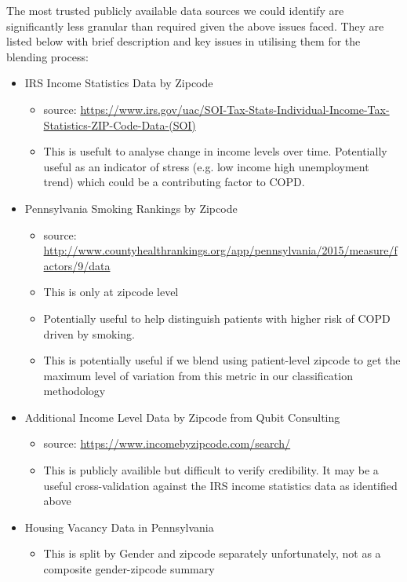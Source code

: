 \documentclass{article}
\begin{document}
The most trusted publicly available data sources we could identify are 
significantly less granular than required given the above issues faced. They are 
listed below with brief description and key issues in utilising them 
for the blending process:

\begin{itemize}
  \item  IRS Income Statistics Data by Zipcode
  \begin{itemize}
    \item source: \url{https://www.irs.gov/uac/SOI-Tax-Stats-Individual-Income-Tax-Statistics-ZIP-Code-Data-(SOI)}
    \item This is usefult to analyse change in income levels over time. 
          Potentially useful as an indicator of stress (e.g. low income high 
          unemployment trend) which could be a contributing factor to COPD.
  \end{itemize}
  \item Pennsylvania Smoking Rankings by Zipcode
  \begin{itemize}
    \item source: \url{http://www.countyhealthrankings.org/app/pennsylvania/2015/measure/factors/9/data}
    \item This is only at zipcode level
    \item Potentially useful to help distinguish patients with higher risk of
          COPD driven by smoking.
    \item This is potentially useful if we blend using patient-level zipcode 
          to get the maximum level of variation from this metric in 
          our classification methodology
  \end{itemize}
  \item Additional Income Level Data by Zipcode from Qubit Consulting
  \begin{itemize}
    \item source: \url{https://www.incomebyzipcode.com/search/}
    \item This is publicly availible but difficult to verify credibility. It may 
          be a useful cross-validation against the IRS income statistics 
          data as identified above
  \end{itemize}
  \item Housing Vacancy Data in Pennsylvania
  \begin{itemize}
    \item This is split by Gender and zipcode separately unfortunately, not as
          a composite gender-zipcode summary

\end{itemize}
\end{itemize}
\end{document}
